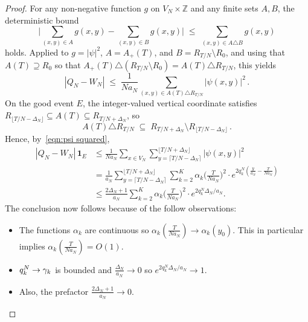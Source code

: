 \documentclass[11pt,a4paper,reqno]{amsart}
\theoremstyle{definition}
\newcommand{\bbZ}{{\ensuremath{\mathbb Z}} }
\let\a=\alpha \let\b=\beta   \let\d=\delta  \let\e=\varepsilon
\begin{document}
\begin{proof}
For any non-negative function $g$ on $V_N \times \bbZ$ and any finite sets $A, B$, the deterministic bound
	\[ \Big| \sum_{(x,y) \in A} g(x,y) - \sum_{(x,y) \in B} g(x,y) \Big|
	\;\leq\; \sum_{(x,y) \in A \triangle B} g(x,y) \]
holds. Applied to $g = |\psi|^2$, $A = A_+(T)$, and $B = R_{T/N}\setminus R_0$, and using that $A(T) \supseteq R_0$ so that $A_+(T) \triangle (R_{T/N}\setminus R_0) = A(T) \triangle R_{T/N}$, this yields
	\[ |Q_N - W_N| \;\leq\; \frac{1}{N a_N}\sum_{(x,y) \in A(T)\triangle R_{T/N}} |\psi(x,y)|^2\,. \]
On the good event $E$, the integer-valued vertical coordinate satisfies $R_{\lfloor T/N - \Delta_N\rfloor} \subseteq A(T) \subseteq R_{T/N + \Delta_N}$, so
	\[ A(T)\triangle R_{T/N} \;\subseteq\; R_{T/N + \Delta_N} \setminus R_{\lfloor T/N - \Delta_N\rfloor}\,. \]
Hence, by~\eqref{eqn:psi squared},
\begin{align}
|Q_N- W_N|\,  \mathbf{1}_{E}
& \leq \frac{1}{N a_N} \sum_{x \in V_N} \sum_{y=\lceil T/N-\Delta_N\rceil}^{\lfloor T/N + \Delta_N\rfloor} | \psi(x,y)|^2 \nonumber \\
& = \frac{1}{a_N} \sum_{y=\lceil T/N-\Delta_N\rceil}^{\lfloor T/N + \Delta_N\rfloor} \sum_{k=2}^K \alpha_k \!\big( \tfrac{T}{Na_N} \big)^2
\cdot e^{2 q_k^N ( \frac{y}{a_N} - \frac{T}{N a_N} ) } \nonumber \\
& \leq \frac{2 \Delta_N+1}{a_N} \sum_{k=2}^K \alpha_k \!\big( \tfrac{T}{Na_N} \big)^2
\cdot e^{2 q_k^N  \Delta_N / a_N } . \nonumber
\end{align}
The conclusion now follows because of the follow observations:
\begin{itemize}
\item The functions $\a_k$ are continuous so $\a_k( \tfrac{T}{Na_N} ) \to \a_k(y_0)$. This in  particular implies $\a_k( \tfrac{T}{Na_N} ) = O(1)$. 

\item $q_k^N \to \gamma_k$ is bounded and $\tfrac{\Delta_N}{a_N} \to 0$ so $e^{2 q_k^N \Delta_N/a_N} \to 1$. 

\item Also, the prefactor $\tfrac{2\Delta_N + 1}{a_N} \to 0$.
\end{itemize}
\end{proof}
\end{document}
